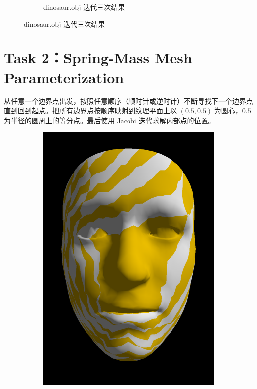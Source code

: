 \documentclass[UTF8]{ctexart}
\begin{document}
\begin{figure}[h]
\begin{subfigure}[b]{0.48\textwidth}
        \caption{dinosaur.obj 迭代三次结果}
    \end{subfigure}
\end{figure}

\section*{Task 2：Spring-Mass Mesh Parameterization}

从任意一个边界点出发，按照任意顺序（顺时针或逆时针）不断寻找下一个边界点直到回到起点。把所有边界点按顺序映射到纹理平面上以 $(0.5, 0.5)$ 为圆心，$0.5$ 为半径的圆周上的等分点。最后使用 Jacobi 迭代求解内部点的位置。

\begin{figure}[h]
    \begin{subfigure}[b]{0.32\textwidth}
        \centering
        \includegraphics[height=0.3\textheight]{images/2-1.png}

\end{subfigure}
\end{figure}
\end{document}
